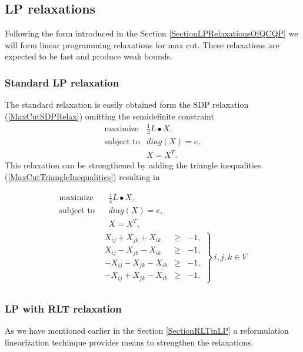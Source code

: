 \documentclass[12pt]{book}
\theoremstyle{definition}
\begin{document}
\subsection{LP relaxations}
Following the form introduced in the Section \ref{SectionLPRelaxationsOfQCQP} we will form linear programming relaxations for max cut. These relaxations are expected to be fast and produce weak bounds.

\subsubsection{Standard LP relaxation}
The standard relaxation is easily obtained form the SDP relaxation (\ref{MaxCutSDPRelax}) omitting the semidefinite constraint
\begin{equation}
\label{MaxCutLPRelaxStandard}
\begin{array}{ll}
\mbox{maximize} & \frac{1}{4}L\bullet X, \\
\mbox{subject to} & diag(X) = e ,\\
&	X=X^T.
\end{array}
\end{equation} 
This relaxation can be strengthened by adding the triangle inequalities (\ref{MaxCutTriangleInequalities}) resulting in 

\begin{equation}
\label{MaxCutLPRelaxTriag}
\begin{array}{ll}
\mbox{maximize} & \  \ \ \ \frac{1}{4}L\bullet X, \\
\mbox{subject to} &\ \ \ \ diag(X) = e, \\
&\ \ \	\ X=X^T ,\\
& \left.\begin{array}{rcl}
X_{ij} + X_{jk} + X_{ik} &\geq & -1, \\
X_{ij} - X_{jk} - X_{ik} &\geq & -1, \\
- X_{ij} - X_{jk} - X_{ik} &\geq & -1, \\
- X_{ij} + X_{jk} - X_{ik} &\geq & -1.
\end{array}\right\rbrace \ i,j,k \in V \\
\end{array}
\end{equation} 

\subsubsection{LP with RLT relaxation} 
As we have mentioned earlier in the Section \ref{SectionRLTinLP} a reformulation linearization techinque provides means to strengthen the relaxations. 
\end{document}
